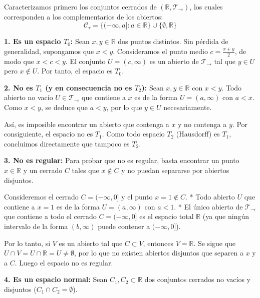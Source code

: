 \begin{sol}
    Caracterizamos primero los conjuntos cerrados de $(\mathbb{R}, \mathcal{T}_{\rightarrow})$, los cuales corresponden a los complementarios de los abiertos:
    \[
        \mathcal{C}_{\tau} = \{(-\infty, a] : a \in \mathbb{R}\} \cup \{\emptyset, \mathbb{R}\}
    \]

    \noindent \textbf{1. Es un espacio $T_0$:}
    Sean $x, y \in \mathbb{R}$ dos puntos distintos. Sin pérdida de generalidad, supongamos que $x < y$.
    Consideramos el punto medio $c = \frac{x+y}{2}$, de modo que $x < c < y$. El conjunto $U = (c, \infty)$ es un abierto de $\mathcal{T}_{\rightarrow}$ tal que $y \in U$ pero $x \notin U$. Por tanto, el espacio es $T_0$.

    \medskip

    \noindent \textbf{2. No es $T_1$ (y en consecuencia no es $T_2$):}
    Sean $x, y \in \mathbb{R}$ con $x < y$. Todo abierto no vacío $U \in \mathcal{T}_{\rightarrow}$ que contiene a $x$ es de la forma $U = (a, \infty)$ con $a < x$. Como $x < y$, se deduce que $a < y$, por lo que $y \in U$ necesariamente.
    
    Así, es imposible encontrar un abierto que contenga a $x$ y no contenga a $y$. Por consiguiente, el espacio no es $T_1$. Como todo espacio $T_2$ (Hausdorff) es $T_1$, concluimos directamente que tampoco es $T_2$.

    \medskip

    \noindent \textbf{3. No es regular:}
    Para probar que no es regular, basta encontrar un punto $x \in \mathbb{R}$ y un cerrado $C$ tales que $x \notin C$ y no puedan separarse por abiertos disjuntos.
    
    Consideremos el cerrado $C = (-\infty, 0]$ y el punto $x = 1 \notin C$. 
    * Todo abierto $U$ que contiene a $x = 1$ es de la forma $U = (a, \infty)$ con $a < 1$.
    * El único abierto de $\mathcal{T}_{\rightarrow}$ que contiene a todo el cerrado $C = (-\infty, 0]$ es el espacio total $\mathbb{R}$ (ya que ningún intervalo de la forma $(b, \infty)$ puede contener a $(-\infty, 0]$).
    
    Por lo tanto, si $V$ es un abierto tal que $C \subset V$, entonces $V = \mathbb{R}$. Se sigue que $U \cap V = U \cap \mathbb{R} = U \neq \emptyset$, por lo que no existen abiertos disjuntos que separen a $x$ y a $C$. Luego el espacio no es regular.

    \medskip

    \noindent \textbf{4. Es un espacio normal:}
    Sean $C_1, C_2 \subset \mathbb{R}$ dos conjuntos cerrados no vacíos y disjuntos ($C_1 \cap C_2 = \emptyset$).
    

\end{sol}
